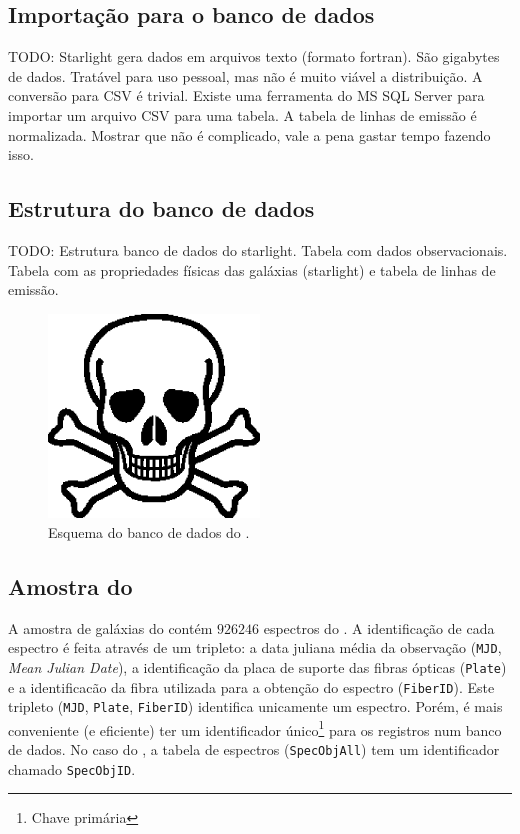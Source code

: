 \subsection{Importação para o banco de dados}
TODO: Starlight gera dados em arquivos texto (formato fortran). São gigabytes de
dados. Tratável para uso pessoal, mas não é muito viável a distribuição. A
conversão para CSV é trivial. Existe uma ferramenta do MS SQL Server para
importar um arquivo CSV para uma tabela. A tabela de linhas de emissão é
normalizada. Mostrar que não é complicado, vale a pena gastar tempo fazendo
isso.

\subsection{Estrutura do banco de dados}
TODO: Estrutura banco de dados do starlight. Tabela com dados observacionais.
Tabela com as propriedades físicas das galáxias (starlight) e tabela de linhas
de emissão.

\begin{figure}
	\includegraphics[width=0.5\textwidth]{figuras/test.eps}
	\caption[Esquema do banco de dados do \starlight.]
	{Esquema do banco de dados do \starlight.}
	\label{fig:EsquemaBDStarlight}
\end{figure}

\subsection{Amostra do \starlight}
\label{sec:Crossmatch:AmostraStarlight}
A amostra de galáxias do \starlight contém $926246$ espectros do \SDSS. A
identificação de cada espectro é feita através de um tripleto: a data juliana
média da observação ({\tt MJD}, {\em Mean Julian Date}), a identificação da
placa de suporte das fibras ópticas ({\tt Plate}) e a identificacão da fibra
utilizada para a obtenção do espectro ({\tt FiberID}). Este tripleto ({\tt MJD},
{\tt Plate}, {\tt FiberID}) identifica unicamente um espectro. Porém, é mais
conveniente (e eficiente) ter um identificador único{\footnote{Chave primária
\fixme}} para os registros num banco de dados. No caso do \SDSS, a tabela de
espectros ({\tt SpecObjAll}) tem um identificador chamado {\tt SpecObjID}.

